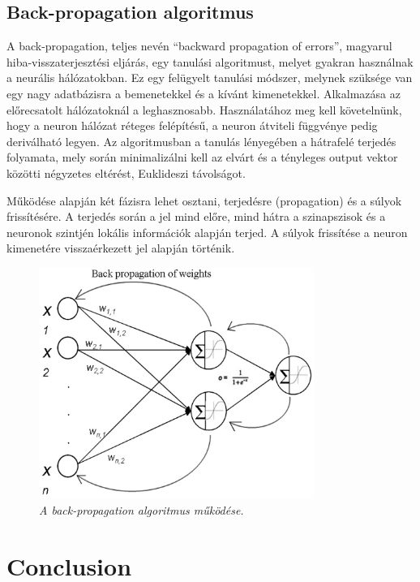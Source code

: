 \documentclass[a4paper]{article}
\begin{document}
\subsection{Back-propagation algoritmus}
A back-propagation, teljes nevén ``backward propagation of errors'', magyarul hiba-visszaterjesztési eljárás, egy tanulási algoritmust, melyet gyakran használnak a neurális hálózatokban. Ez egy felügyelt tanulási módszer, melynek szüksége van egy nagy adatbázisra a bemenetekkel és a kívánt kimenetekkel. Alkalmazása az előrecsatolt hálózatoknál a leghasznosabb. Használatához meg kell követelnünk, hogy a neuron hálózat réteges felépítésű, a neuron átviteli függvénye pedig deriválható legyen. Az algoritmusban a tanulás lényegében a hátrafelé terjedés folyamata, mely során minimalizálni kell az elvárt és a tényleges output vektor közötti négyzetes eltérést, Euklideszi távolságot.

Működése alapján két fázisra lehet osztani, terjedésre (propagation) és a súlyok frissítésére. A terjedés során a jel mind előre, mind hátra a szinapszisok és a neuronok szintjén lokális információk alapján terjed. A súlyok frissítése a neuron kimenetére visszaérkezett jel alapján történik.

\begin{figure}[hb]
  \centering
  \includegraphics[width=0.8\textwidth]{backpropagation}
  \caption{\textit{A back-propagation algoritmus működése.}}
\end{figure}

\section{Conclusion}
\end{document}

